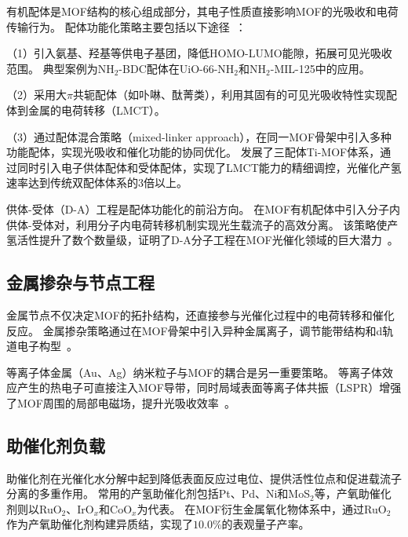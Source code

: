 有机配体是MOF结构的核心组成部分，其电子性质直接影响MOF的光吸收和电荷传输行为。
配体功能化策略主要包括以下途径~\citep{li2024mof_composites_h2}： %

（1）引入氨基、羟基等供电子基团，降低HOMO-LUMO能隙，拓展可见光吸收范围。
典型案例为NH$_2$-BDC配体在UiO-66-NH$_2$和NH$_2$-MIL-125中的应用。

（2）采用大$\pi$共轭配体（如卟啉、酞菁类），利用其固有的可见光吸收特性实现配体到金属的电荷转移（LMCT）。

（3）通过配体混合策略（mixed-linker approach），在同一MOF骨架中引入多种功能配体，实现光吸收和催化功能的协同优化。
\citet{liu2024three_ligand_timof}发展了三配体Ti-MOF体系，通过同时引入电子供体配体和受体配体，实现了LMCT能力的精细调控，光催化产氢速率达到传统双配体体系的3倍以上。 %

供体-受体（D-A）工程是配体功能化的前沿方向。
\citet{yan2023donor_acceptor_mof}在MOF有机配体中引入分子内供体-受体对，利用分子内电荷转移机制实现光生载流子的高效分离。 %
该策略使产氢活性提升了数个数量级，证明了D-A分子工程在MOF光催化领域的巨大潜力~\citep{yan2023donor_acceptor_mof}。 %


\subsection{金属掺杂与节点工程}

金属节点不仅决定MOF的拓扑结构，还直接参与光催化过程中的电荷转移和催化反应。
金属掺杂策略通过在MOF骨架中引入异种金属离子，调节能带结构和d轨道电子构型~\citep{li2024mof_composites_h2}。 %

等离子体金属（Au、Ag）纳米粒子与MOF的耦合是另一重要策略。
等离子体效应产生的热电子可直接注入MOF导带，同时局域表面等离子体共振（LSPR）增强了MOF周围的局部电磁场，提升光吸收效率~\citep{li2024mof_composites_h2}。 %


\subsection{助催化剂负载}

助催化剂在光催化水分解中起到降低表面反应过电位、提供活性位点和促进载流子分离的多重作用。 %
常用的产氢助催化剂包括Pt、Pd、Ni和MoS$_2$等，产氧助催化剂则以RuO$_2$、IrO$_x$和CoO$_x$为代表。 %
\citet{rtta2024heterojunction}在MOF衍生金属氧化物体系中，通过RuO$_2$作为产氧助催化剂构建异质结，实现了$10.0\%$的表观量子产率。 %

